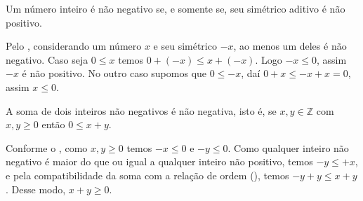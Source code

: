 \documentclass[../main.tex]{subfiles}
\begin{document}
\begin{corol}\label{int-corol-simetricoSinalTrocado}
    Um número inteiro é não negativo se, e somente se, seu simétrico aditivo é não positivo.
\end{corol}
\begin{dem}
    Pelo , considerando um número $x$ e seu simétrico $-x$, ao menos um deles é não negativo. Caso seja $0 \leq x$ temos $0 + (-x) \leq x + (-x)$. Logo $-x \leq 0$, assim $-x$ é não positivo. No outro caso supomos que $0 \leq -x$, daí 
    $0 + x \leq -x + x = 0$, assim $x \leq 0$.
\end{dem}

\begin{prop}\label{int-prop-somaPositivosPositiva}
    A soma de dois inteiros não negativos é não negativa, isto é, se $x, y \in \mathbb{Z}$ com $x,y \geq 0$ então $0 \leq x+y$.
\end{prop}
\begin{dem}
    Conforme o , como $x,y \geq 0$ temos $-x \leq 0$ e $-y \leq 0$. Como qualquer inteiro não negativo é maior do que ou igual a qualquer inteiro não positivo, temos $-y \leq +x$, e pela compatibilidade da soma com a relação de ordem (), temos 
    $-y + y \leq x + y$. Desse modo, $x+y \geq 0$.
\end{dem}
\end{document}
